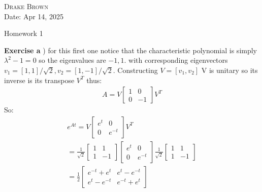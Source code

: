 \documentclass[12pt]{article}
\newenvironment{exercise}[1]{\vspace{.1in}\noindent\textbf{Exercise #1 \hspace{.05em}}}{}
\theoremstyle{definition}
\theoremstyle{remark}
\begin{document}
\begin{flushright}
	\textsc{Drake Brown}  \\
	Date: Apr 14, 2025
\end{flushright}
\begin{center}
	Homework 1
\end{center}

\begin{exercise}{4.1}
	a) for this first one notice that the characteristic polynomial is simply $\lambda^2-1=0$ so the eigenvalues are $-1,1$. with corresponding eigenvectors $v_1=[1,1]/\sqrt{2},v_2=[1,-1]/\sqrt{2}$. Constructing $V=[v_1,v_2]$ V is unitary so its inverse is its transpose $V^T$ thus:
	\begin{align}
		A=V\begin{bmatrix}1&0\\0&-1\end{bmatrix}V^T
	\end{align}
	So:
	\begin{align}
		e^{At}=V
		\begin{bmatrix}
			e^t & 0      \\
			0   & e^{-t}
		\end{bmatrix}V^T                              \\
		=\frac{1}{\sqrt{2}}\begin{bmatrix}
			                   1 & 1  \\
			                   1 & -1
		                   \end{bmatrix}
		\begin{bmatrix}
			e^t & 0      \\
			0   & e^{-t}
		\end{bmatrix}\frac{1}{\sqrt{2}}\begin{bmatrix}
			                               1 & 1  \\
			                               1 & -1
		                               \end{bmatrix} \\
		= \frac{1}{2}    %
		\begin{bmatrix}
			e^{-t}+e^t & e^t-e^{-t} \\
			e^t-e^{-t} & e^{-t}+e^t
		\end{bmatrix}
	\end{align}


\end{exercise}
\end{document}
